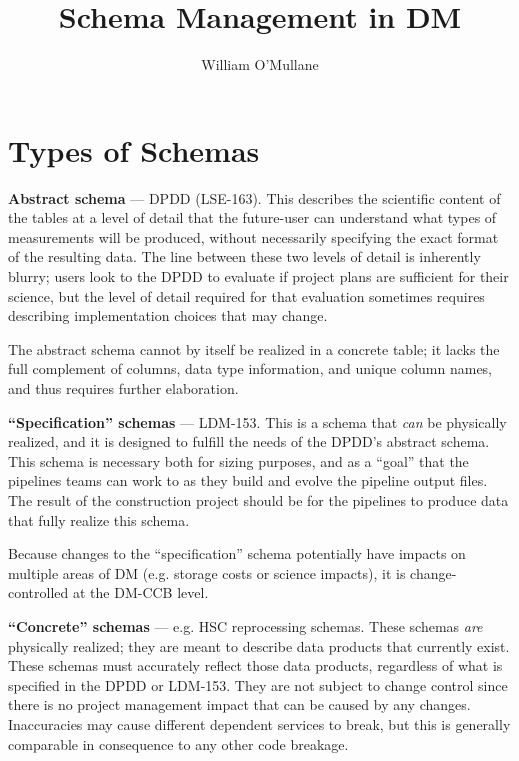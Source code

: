 \documentclass[DM,authoryear,toc]{lsstdoc}
\title{Schema Management in DM}
\author{%
William O'Mullane
}
\date{\vcsDate}
\begin{document}
\maketitle


\section{Types of Schemas}

\textbf{Abstract schema} --- DPDD (LSE-163). This describes the scientific content of the tables at a
level of detail that the future-user can understand what types of measurements will be produced,
without necessarily specifying the exact format of the resulting data. The line between these two
levels of detail is inherently blurry; users look to the DPDD to evaluate if project plans are
sufficient for their science, but the level of detail required for that evaluation sometimes
requires describing implementation choices that may change.

The abstract schema cannot by itself be realized in a concrete table; it lacks the full complement
of columns, data type information, and unique column names, and thus requires further elaboration.

\textbf{``Specification'' schemas} --- LDM-153. This is a schema that \textit{can} be physically
realized, and it is designed to fulfill the needs of the DPDD's abstract schema. This schema is
necessary both for sizing purposes, and as a ``goal'' that the pipelines teams can work to as they
build and evolve the pipeline output files. The result of the construction project should be for the
pipelines to produce data that fully realize this schema.

Because changes to the ``specification'' schema potentially have impacts on multiple areas of DM (e.g.
storage costs or science impacts), it is change-controlled at the DM-CCB level.


\textbf{``Concrete'' schemas} --- e.g. HSC reprocessing schemas. These schemas \textit{are}
physically realized; they are meant to describe data products that currently exist. These schemas
must accurately reflect those data products, regardless of what is specified in the DPDD or LDM-153.
They are not subject to change control since there is no project management impact that can be
caused by any changes. Inaccuracies may cause different dependent services to break, but this is
generally comparable in consequence to any other code breakage.
\end{document}
